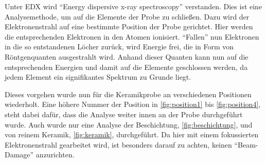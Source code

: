 \documentclass[12pt,english,ngerman]{scrartcl}
\begin{document}
Unter EDX wird ``Energy dispersive x-ray spectroscopy'' verstanden. Dies ist
eine Analysemethode, um auf die Elemente der Probe zu schließen. Dazu wird der
Elektronenstrahl auf eine bestimmte Position der Probe gerichtet. Hier werden
die entsprechenden Elektronen in den Atomen ionisiert. ``Fallen'' nun
Elektronen in die so entstandenen Löcher zurück, wird Energie frei, die in Form
von Röntgenquanten ausgestrahlt wird. Anhand dieser Quanten kann nun auf die
entsprechenden Energien und damit auf die Elemente geschlossen werden, da jedem
Element ein signifikantes Spektrum zu Grunde liegt.

Dieses vorgehen wurde nun für die Keramikprobe an verschiedenen Positionen
wiederholt. Eine höhere Nummer der Position in \autoref{fig:position1} bis
\autoref{fig:position4},
steht dabei dafür, dass die Analyse weiter innen an der Probe durchgeführt
wurde. Auch wurde nur eine Analyse der Beschichtung,
\autoref{fig:beschichtung}, und von reinem Keramik, \autoref{fig:keramik},
durchgeführt. Da hier mit einem fokussierten Elektronenstrahl gearbeitet wird,
ist besonders darauf zu achten, keinen ``Beam-Damage'' anzurichten.
\end{document}
